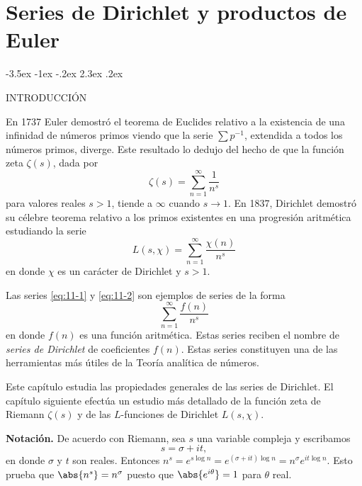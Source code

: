 \documentclass[12pt,a4paper]{book}
\makeatletter
\renewcommand\section{\@startsection{section}{1}{\z@}%
  {-3.5ex \@plus -1ex \@minus -.2ex}%
  {2.3ex \@plus .2ex}%
  {\normalfont\Large\bfseries\raggedright}}
\makeatother
\begin{document}
\chapter{Series de Dirichlet y productos de Euler}

    \section{INTRODUCCIÓN}

    En 1737 Euler \cite{euler1737} demostró el teorema de Euclides relativo a la existencia de una infinidad
    de números primos viendo que la serie $\sum p^{-1}$, extendida a todos los números
    primos, diverge. Este resultado lo dedujo del hecho de que la función zeta $\zeta(s)$,
    dada por
    \begin{equation}\label{eq:11-1}
        \zeta(s)=\sum_{n=1}^{\infty}\frac{1}{n^{s}}
    \end{equation}
    para valores reales $s>1$, tiende a $\infty$ cuando $s\to1$. En 1837, Dirichlet \cite{dirichlet1837} demostró
    su célebre teorema relativo a los primos existentes en una progresión aritmética
    estudiando la serie
    \begin{equation}\label{eq:11-2}
        L(s,\chi)=\sum_{n=1}^{\infty}\frac{\chi(n)}{n^{s}}
    \end{equation}
    en donde $\chi$ es un carácter de Dirichlet y $s>1$.\label{sim:Lsx}

    Las series \eqref{eq:11-1} y \eqref{eq:11-2} son ejemplos de series de la forma
    \begin{equation}\label{eq:11-3}
        \sum_{n=1}^{\infty}\frac{f(n)}{n^{s}}
    \end{equation}
    en donde $f(n)$ es una función aritmética. Estas series reciben el nombre de
    \textit{series de Dirichlet} de coeficientes $f(n)$. Estas series constituyen una de las
    herramientas más útiles de la Teoría analítica de números.

    Este capítulo estudia las propiedades generales de las series de Dirichlet. El capítulo
    siguiente efectúa un estudio más detallado de la función zeta de Riemann $\zeta(s)$ y de
    las $L$-funciones de Dirichlet $L(s,\chi)$.

    \textbf{Notación.} De acuerdo con Riemann, sea $s$ una variable compleja y escribamos
    \begin{equation*}
        s=\sigma+it,
    \end{equation*}
    en donde $\sigma$ y $t$ son reales. Entonces
    $n^{s}=e^{s\log n}=e^{(\sigma+it)\log n}=n^{\sigma}e^{it\log n}$. Esto prueba que
    $\abs{n^{s}}=n^{\sigma}$ puesto que $\abs{e^{i\theta}}=1$ para $\theta$ real.
\end{document}
